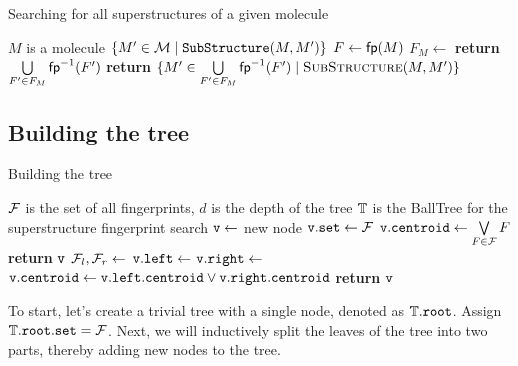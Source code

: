 \begin{algorithm}[!ht]
  \caption{Searching for all superstructures of a given molecule} \label{alg:FindMetaStructures}
  \begin{algorithmic}[1]
    \Require $M $ is a molecule 
    \Ensure $\{M' \in \mathcal{M} \mid {\tt SubStructure}(M, M') \}$ 
    \State $F \gets {\sf fp}(M) $ 
    \State $F_M \gets $ 
    \State \textbf{return} $\bigcup\limits_{F' \in F_M} {\sf fp}^{-1}(F')$  
    \State \textbf{return} $\{M' \in \bigcup\limits_{F' \in F_M} {\sf fp}^{-1}(F') \mid \Call{SubStructure}{M, M'}\}$ 
    \EndProcedure
  \end{algorithmic}
\end{algorithm}

\subsection{Building the tree}

\begin{algorithm}
  \caption{Building the tree} \label{alg:BuildTree}
  \begin{algorithmic}[1]
    \Require $\mathcal{F}$ is the set of all fingerprints, $d$ is the depth of the tree
    \Ensure $\mathbb{T} $ is the BallTree for the superstructure fingerprint search 
      \State ${\tt v} \gets$ new node
	\State ${\tt v.set} \gets \mathcal{F}$ 
	\State ${\tt v.centroid} \gets \bigvee\limits_{F \in \mathcal{F}} F$ 
	\State \textbf{return} ${\tt v}$ 
      \Else 
        \State $\mathcal{F}_l, \mathcal{F}_r \gets $ 
        \State ${\tt v.left} \gets $  
	\State ${\tt v.right} \gets $ 
	\State ${\tt v.centroid} \gets {\tt v.left.centroid} \lor {\tt v.right.centroid}$ 
        \State \textbf{return} ${\tt v}$ 
      \EndIf
    \EndProcedure
  \end{algorithmic}
\end{algorithm}

To start, let's create a trivial tree with a single node, denoted as $\mathbb{T}.{\tt root}$. Assign $\mathbb{T}.{\tt root.set} = \mathcal{F}$. Next, we will inductively split the leaves of the tree into two parts, thereby adding new nodes to the tree.

